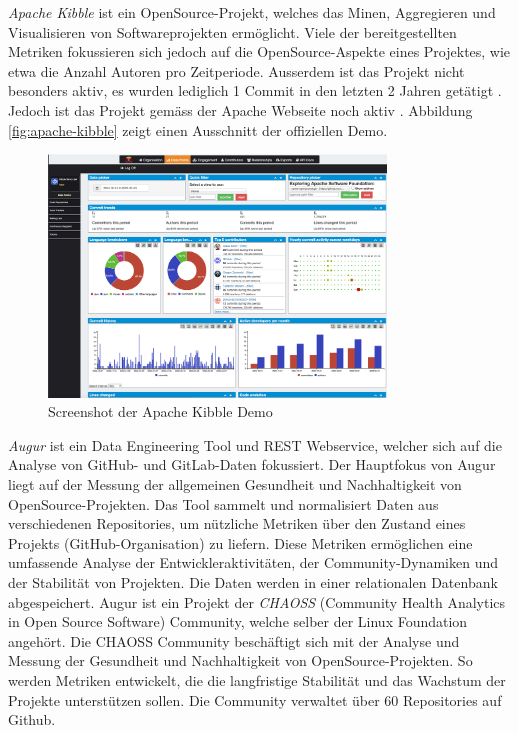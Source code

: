 \textit{Apache Kibble} ist ein OpenSource-Projekt, welches das Minen, Aggregieren und Visualisieren von Softwareprojekten ermöglicht. Viele der bereitgestellten Metriken fokussieren sich jedoch auf die OpenSource-Aspekte eines Projektes, wie etwa die Anzahl Autoren pro Zeitperiode. Ausserdem ist das Projekt nicht besonders aktiv, es wurden lediglich 1 Commit in den letzten 2 Jahren getätigt \parencite{noauthor_apachekibble-1_2025}. Jedoch ist das Projekt gemäss der Apache Webseite noch aktiv \parencite{noauthor_apache_nodate}. Abbildung \autoref{fig:apache-kibble} zeigt einen Ausschnitt der offiziellen Demo. 
\begin{figure}[htbp]
    \centering
    \includegraphics[width=0.8\textwidth]{Figures/apache-kibble.png}
    \caption{Screenshot der Apache Kibble Demo \parencite{noauthor_code_nodate}}
    \label{fig:apache-kibble}
\end{figure}
\newpage
\textit{Augur} ist ein Data Engineering Tool und REST Webservice, welcher sich auf die Analyse von GitHub- und GitLab-Daten fokussiert. Der Hauptfokus von Augur liegt auf der Messung der allgemeinen Gesundheit und Nachhaltigkeit von OpenSource-Projekten. Das Tool sammelt und normalisiert Daten aus verschiedenen Repositories, um nützliche Metriken über den Zustand eines Projekts (GitHub-Organisation) zu liefern. Diese Metriken ermöglichen eine umfassende Analyse der Entwickleraktivitäten, der Community-Dynamiken und der Stabilität von Projekten. Die Daten werden in einer relationalen Datenbank abgespeichert. \parencite{noauthor_chaossaugur_nodate} Augur ist ein Projekt der \textit{CHAOSS} (Community Health Analytics in Open Source Software) Community, welche selber der Linux Foundation angehört. Die CHAOSS Community beschäftigt sich mit der Analyse und Messung der Gesundheit und Nachhaltigkeit von OpenSource-Projekten. So werden Metriken entwickelt, die die langfristige Stabilität und das Wachstum der Projekte unterstützen sollen. Die Community verwaltet über 60 Repositories auf Github. \parencite{noauthor_chaoss_nodate} \parencite{noauthor_about_nodate-1}


